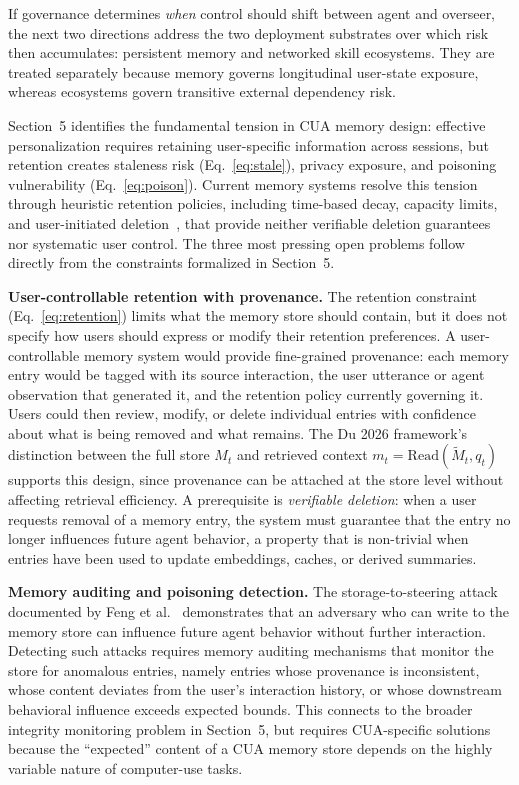 If governance determines \emph{when} control should shift between agent and overseer, the next two directions address the two deployment substrates over which risk then accumulates: persistent memory and networked skill ecosystems. They are treated separately because memory governs longitudinal user-state exposure, whereas ecosystems govern transitive external dependency risk.

Section~5 identifies the fundamental tension in CUA memory design: effective personalization requires retaining user-specific information across sessions, but retention creates staleness risk (Eq.~\ref{eq:stale}), privacy exposure, and poisoning vulnerability (Eq.~\ref{eq:poison}). Current memory systems resolve this tension through heuristic retention policies, including time-based decay, capacity limits, and user-initiated deletion~\cite{mem02024,amem2025}, that provide neither verifiable deletion guarantees nor systematic user control. The three most pressing open problems follow directly from the constraints formalized in Section~5.

\smallskip
\noindent\textbf{User-controllable retention with provenance.}
The retention constraint (Eq.~\ref{eq:retention}) limits what the memory store should contain, but it does not specify how users should express or modify their retention preferences. A user-controllable memory system would provide fine-grained provenance: each memory entry would be tagged with its source interaction, the user utterance or agent observation that generated it, and the retention policy currently governing it. Users could then review, modify, or delete individual entries with confidence about what is being removed and what remains. The Du 2026 framework's distinction between the full store $M_t$ and retrieved context $m_t = \mathrm{Read}(\widetilde{M}_t, q_t)$ supports this design, since provenance can be attached at the store level without affecting retrieval efficiency. A prerequisite is \emph{verifiable deletion}: when a user requests removal of a memory entry, the system must guarantee that the entry no longer influences future agent behavior, a property that is non-trivial when entries have been used to update embeddings, caches, or derived summaries.

\smallskip
\noindent\textbf{Memory auditing and poisoning detection.}
The storage-to-steering attack documented by Feng et al.~\cite{storagetosteering2026} demonstrates that an adversary who can write to the memory store can influence future agent behavior without further interaction. Detecting such attacks requires memory auditing mechanisms that monitor the store for anomalous entries, namely entries whose provenance is inconsistent, whose content deviates from the user's interaction history, or whose downstream behavioral influence exceeds expected bounds. This connects to the broader integrity monitoring problem in Section~5, but requires CUA-specific solutions because the ``expected'' content of a CUA memory store depends on the highly variable nature of computer-use tasks.


